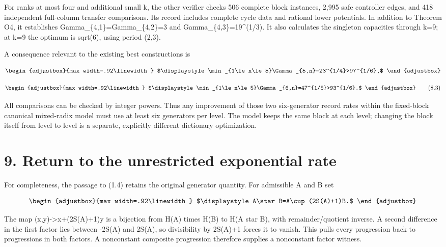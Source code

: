 For ranks at most four and additional small k, the other verifier checks 506 complete block instances, 2,995 safe controller edges, and 418 independent full-column transfer comparisons. Its record includes complete cycle data and rational lower potentials. In addition to Theorem O4, it establishes Gamma\_\{4,1\}=Gamma\_\{4,2\}=3 and Gamma\_\{4,3\}=19\^{}(1/3). It also calculates the singleton capacities through k=9; at k=9 the optimum is sqrt(6), using period (2,3).

A consequence relevant to the existing best constructions is

\[
\begin{adjustbox}{max width=.92\linewidth}
$\displaystyle \min_{1\le n\le5}\Gamma_{5,n}=23^{1/4}>97^{1/6},$
\end{adjustbox}
\]

\[
\begin{adjustbox}{max width=.92\linewidth}
$\displaystyle \min_{1\le n\le5}\Gamma_{6,n}=47^{1/5}>93^{1/6}.$
\end{adjustbox}
\tag{8.3}
\]

All comparisons can be checked by integer powers. Thus any improvement of those two six-generator record rates within the fixed-block canonical mixed-radix model must use at least six generators per level. The model keeps the same block at each level; changing the block itself from level to level is a separate, explicitly different dictionary optimization.

\section{9. Return to the unrestricted exponential rate}\label{n04-return-to-the-unrestricted-exponential-rate}

For completeness, the passage to (1.4) retains the original generator quantity. For admissible A and B set

\[
\begin{adjustbox}{max width=.92\linewidth}
$\displaystyle A\star B=A\cup(2S(A)+1)B.$
\end{adjustbox}
\]

The map (x,y)-\textgreater x+(2S(A)+1)y is a bijection from H(A) times H(B) to H(A star B), with remainder/quotient inverse. A second difference in the first factor lies between -2S(A) and 2S(A), so divisibility by 2S(A)+1 forces it to vanish. This pulls every progression back to progressions in both factors. A nonconstant composite progression therefore supplies a nonconstant factor witness.

